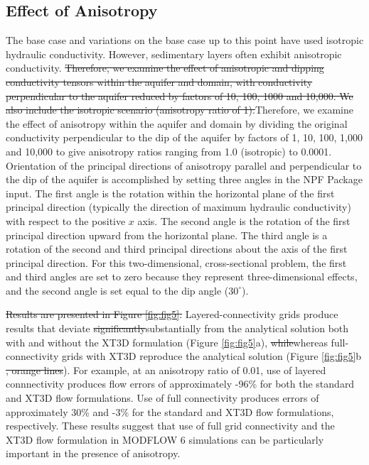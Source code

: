 \documentclass{article}
\begin{document}
\subsection*{Effect of Anisotropy}

The base case and variations {\color{red} on the base case} up to this point have used isotropic hydraulic conductivity. However, sedimentary layers often exhibit anisotropic conductivity. {\color{red} \sout{Therefore, we examine the effect of anisotropic and dipping conductivity tensors within the aquifer and domain, with conductivity perpendicular to the aquifer reduced by factors of 10, 100, 1000 and 10,000. We also include the isotropic scenario (anisotropy ratio of 1).}Therefore, we examine the effect of anisotropy within the aquifer and domain by dividing the original conductivity perpendicular to the dip of the aquifer by factors of 1, 10, 100, 1,000 and 10,000 to give anisotropy ratios ranging from 1.0 (isotropic) to 0.0001.} {\color{red} Orientation of the principal directions of anisotropy parallel and perpendicular to the dip of the aquifer is accomplished by setting three angles in the NPF Package input. The first angle is the rotation within the horizontal plane of the first principal direction (typically the direction of maximum hydraulic conductivity) with respect to the positive $x$ axis. The second angle is the rotation of the first principal direction upward from the horizontal plane. The third angle is a rotation of the second and third principal directions about the axis of the first principal direction. For this two-dimensional, cross-sectional problem, the first and third angles are set to zero because they represent three-dimensional effects, and the second angle is set equal to the dip angle ($30^{\circ}$).}

{\color{red} \sout{Results are presented in Figure \ref{fig:fig5}. }}Layered-connectivity grids produce results that deviate {\color{red} \sout{significantly}substantially} from the analytical solution both with and without the XT3D formulation (Figure \ref{fig:fig5}a), {\color{red} \sout{while}whereas} full-connectivity grids with XT3D reproduce the analytical solution (Figure \ref{fig:fig5}b{\color{red} \sout{, orange lines}}). {\color{red} For example, at an anisotropy ratio of 0.01, use of layered connnectivity produces flow errors of approximately -96\% for both the standard and XT3D flow formulations. Use of full connectivity produces errors of approximately 30\% and -3\% for the standard and XT3D flow formulations, respectively.} {\color{red} These results suggest that use of full grid connectivity and the XT3D flow formulation in MODFLOW 6 simulations can be particularly important in the presence of anisotropy.}
\end{document}
